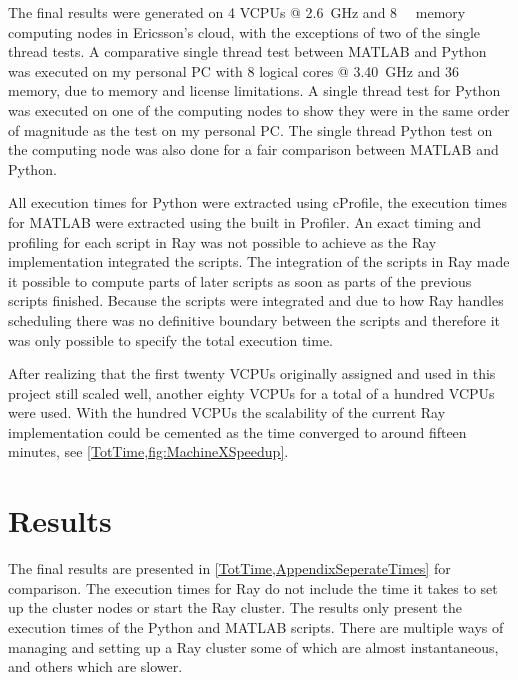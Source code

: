 \documentclass[12pt, a4paper]{article}
\begin{document}
The final results were generated on 4 VCPUs @ \SI{2.6}{\giga\hertz} and \SI{8}{\giga\byte} memory computing nodes in Ericsson's cloud, with the exceptions of two of the single thread tests.
A comparative single thread test between MATLAB and Python was executed on my personal PC with 8 logical cores @ \SI{3.40}{\giga\hertz} and \SI{36}{\giga\byte} memory, due to memory and license limitations. 
A single thread test for Python was executed on one of the computing nodes to show they were in the same order of magnitude as the test on my personal PC.
The single thread Python test on the computing node was also done for a fair comparison between MATLAB and Python.

All execution times for Python were extracted using cProfile, the execution times for MATLAB were extracted using the built in Profiler.
An exact timing and profiling for each script in Ray was not possible to achieve as the Ray implementation integrated the scripts.
The integration of the scripts in Ray made it possible to compute parts of later scripts as soon as parts of the previous scripts finished.
Because the scripts were integrated and due to how Ray handles scheduling there was no definitive boundary between the scripts and therefore it was only possible to specify the total execution time.

After realizing that the first twenty VCPUs originally assigned and used in this project still scaled well, another eighty VCPUs for a total of a hundred VCPUs were used. With the hundred VCPUs the scalability of the current Ray implementation could be cemented as the time converged to around fifteen minutes, see \cref{TotTime,fig:MachineXSpeedup}.

\section{Results}

The final results are presented in \cref{TotTime,AppendixSeperateTimes} for comparison.
The execution times for Ray do not include the time it takes to set up the cluster nodes or start the Ray cluster.
The results only present the execution times of the Python and MATLAB scripts.
There are multiple ways of managing and setting up a Ray cluster some of which are almost instantaneous, and others which are slower. 
\end{document}
